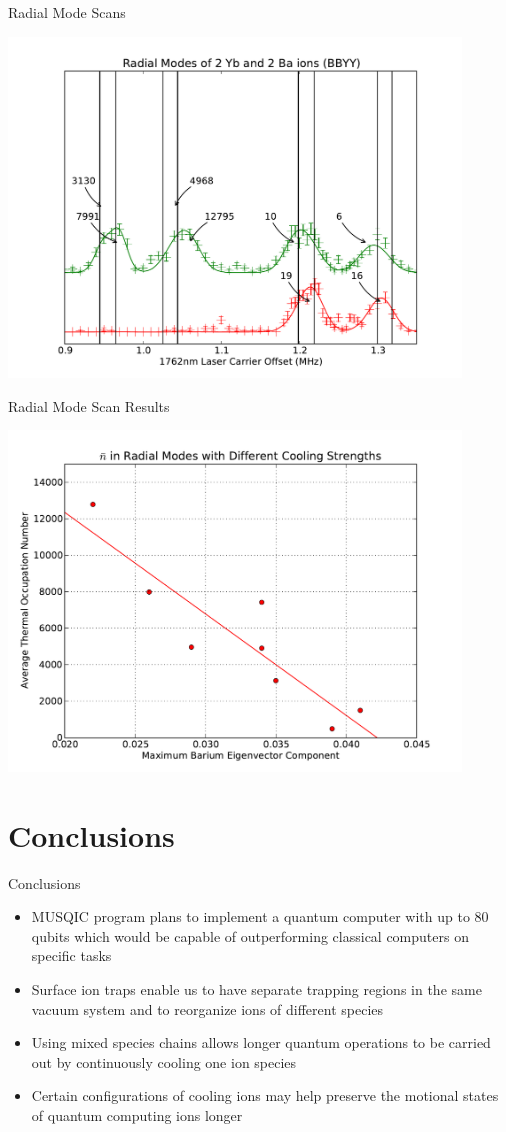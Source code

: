 \documentclass{beamer}
\begin{document}
\begin{frame}{Radial Mode Scans}
	\centerline{\includegraphics[width=0.9\textwidth]{RadialScanBBYY}}
\end{frame}

\begin{frame}{Radial Mode Scan Results}
	\centerline{\includegraphics[width=0.9\textwidth]{RadialNBarEigenvectors}}
\end{frame}

\section[]{Conclusions}
\begin{frame}{Conclusions}
\begin{itemize}
	\item MUSQIC program plans to implement a quantum computer with up to 80 qubits which would be capable of outperforming classical computers on specific tasks
	\item Surface ion traps enable us to have separate trapping regions in the same vacuum system and to reorganize ions of different species
	\item Using mixed species chains allows longer quantum operations to be carried out by continuously cooling one ion species
	\item Certain configurations of cooling ions may help preserve the motional states of quantum computing ions longer
\end{itemize}
\end{frame}
\end{document}
